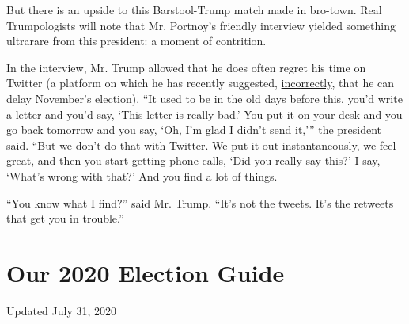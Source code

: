 But there is an upside to this Barstool-Trump match made in bro-town.
Real Trumpologists will note that Mr. Portnoy's friendly interview
yielded something ultrarare from this president: a moment of contrition.

In the interview, Mr. Trump allowed that he does often regret his time
on Twitter (a platform on which he has recently suggested,
\href{https://www.nytimes3xbfgragh.onion/2020/07/30/us/politics/trump-postpone-election.html}{incorrectly},
that he can delay November's election). ``It used to be in the old days
before this, you'd write a letter and you'd say, `This letter is really
bad.' You put it on your desk and you go back tomorrow and you say, `Oh,
I'm glad I didn't send it,''' the president said. ``But we don't do that
with Twitter. We put it out instantaneously, we feel great, and then you
start getting phone calls, `Did you really say this?' I say, `What's
wrong with that?' And you find a lot of things.

``You know what I find?'' said Mr. Trump. ``It's not the tweets. It's
the retweets that get you in trouble.''

\hypertarget{our-2020-election-guide}{%
\section{Our 2020 Election Guide}\label{our-2020-election-guide}}

Updated July 31, 2020

